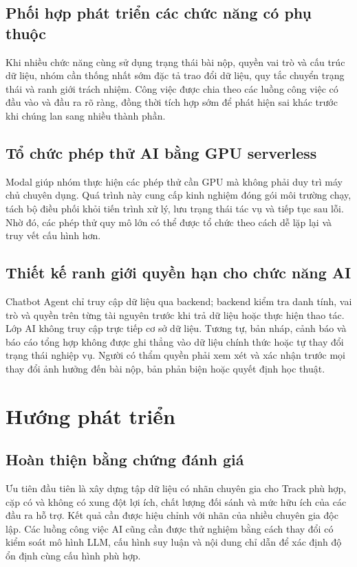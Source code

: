 \subsection{Phối hợp phát triển các chức năng có phụ thuộc}

Khi nhiều chức năng cùng sử dụng trạng thái bài nộp, quyền vai trò và cấu trúc dữ liệu, nhóm cần thống nhất sớm đặc tả trao đổi dữ liệu, quy tắc chuyển trạng thái và ranh giới trách nhiệm. Công việc được chia theo các luồng công việc có đầu vào và đầu ra rõ ràng, đồng thời tích hợp sớm để phát hiện sai khác trước khi chúng lan sang nhiều thành phần.

\subsection{Tổ chức phép thử AI bằng GPU serverless}

Modal giúp nhóm thực hiện các phép thử cần GPU mà không phải duy trì máy chủ chuyên dụng. Quá trình này cung cấp kinh nghiệm đóng gói môi trường chạy, tách bộ điều phối khỏi tiến trình xử lý, lưu trạng thái tác vụ và tiếp tục sau lỗi. Nhờ đó, các phép thử quy mô lớn có thể được tổ chức theo cách dễ lặp lại và truy vết cấu hình hơn.

\subsection{Thiết kế ranh giới quyền hạn cho chức năng AI}

Chatbot Agent chỉ truy cập dữ liệu qua backend; backend kiểm tra danh tính, vai trò và quyền trên từng tài nguyên trước khi trả dữ liệu hoặc thực hiện thao tác. Lớp AI không truy cập trực tiếp cơ sở dữ liệu. Tương tự, bản nháp, cảnh báo và báo cáo tổng hợp không được ghi thẳng vào dữ liệu chính thức hoặc tự thay đổi trạng thái nghiệp vụ. Người có thẩm quyền phải xem xét và xác nhận trước mọi thay đổi ảnh hưởng đến bài nộp, bản phản biện hoặc quyết định học thuật.

\section{Hướng phát triển}

\subsection{Hoàn thiện bằng chứng đánh giá}

Ưu tiên đầu tiên là xây dựng tập dữ liệu có nhãn chuyên gia cho Track phù hợp, cặp có và không có xung đột lợi ích, chất lượng đối sánh và mức hữu ích của các đầu ra hỗ trợ. Kết quả cần được hiệu chỉnh với nhãn của nhiều chuyên gia độc lập. Các luồng công việc AI cũng cần được thử nghiệm bằng cách thay đổi có kiểm soát mô hình LLM, cấu hình suy luận và nội dung chỉ dẫn để xác định độ ổn định cùng cấu hình phù hợp.

